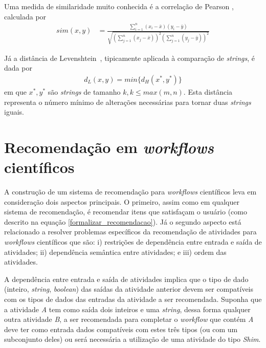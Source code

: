 Uma medida de similaridade muito conhecida é a correlação de Pearson \cite{Deza2009}, calculada por
\begin{align}
sim(x,y) &= \frac{\sum\limits_{i=1}^{n} (x_{i}-\bar{x})(y_{i} - \bar{y})}
{\sqrt{ \left( \sum\limits_{j=1}^{n}(x_{j}-\bar{x}) \right) ^{2} \left( \sum\limits_{j=1}^{n}(y_{j}-\bar{y})\right)^{2}} } \label{similaridade_pearson}
\end{align}

Já a distância de Levenshtein~\cite{Deza2009}, tipicamente aplicada à comparação de \emph{strings}, é dada por
\begin{align}
d_{L}(x,y) = min\{d_{H}(x^{*}, y^{*})\} \label{dist_Levenshtein}
\end{align}
em que \(x^{*}, y^{*}\) são \emph{strings} de tamanho \(k, k \leq max(m, n)\). Esta distância representa o número mínimo de alterações necessárias para tornar duas \emph{strings} iguais.

\section{Recomendação em \emph{workflows} científicos}\label{SEC_RECOMENDACAO_WORKFLOW_CIENTIFICO}
A construção de um sistema de recomendação para \emph{workflows} científicos leva em consideração dois aspectos principais. O primeiro, assim como em qualquer sistema de recomendação, é recomendar itens que satisfaçam o usuário (como descrito na equação \eqref{formalizar_recomendacao}). Já o segundo aspecto está relacionado a resolver problemas específicos da recomendação de atividades para \emph{workflows} científicos que são: i) restrições de dependência entre entrada e saída de atividades; ii) dependência semântica entre atividades; e iii) ordem das atividades.

A dependência entre entrada e saída de atividades implica que o tipo de dado (inteiro, \emph{string}, \emph{boolean}) das saídas da atividade anterior devem ser compatíveis com os tipos de dados das entradas da atividade a ser recomendada. Suponha que a atividade \emph{A} tem como saída dois inteiros e uma \emph{string}, dessa forma qualquer outra atividade \emph{B}, a ser recomendada para completar o \emph{workflow} que contém \emph{A} deve ter como entrada dados compatíveis com estes três tipos (ou com um subconjunto deles) ou será necessária a utilização de uma atividade do tipo \emph{Shim}.

